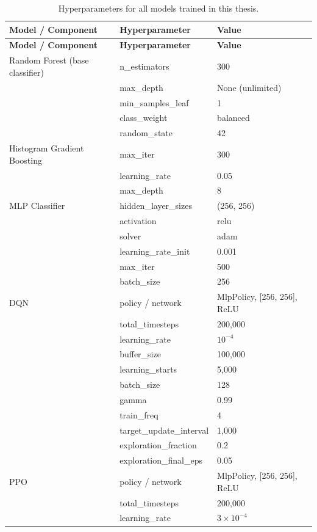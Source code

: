 \begin{longtable}{p{5.8cm} p{5.0cm} p{3.0cm}}
\caption{Hyperparameters for all models trained in this thesis.}
\label{tab:hyperparams}\\
\toprule
\textbf{Model / Component} & \textbf{Hyperparameter} & \textbf{Value} \\
\midrule
\endfirsthead
\toprule
\textbf{Model / Component} & \textbf{Hyperparameter} & \textbf{Value} \\
\midrule
\endhead
\bottomrule
\endfoot
Random Forest (base classifier) & n\_estimators & 300 \\
 & max\_depth & None (unlimited) \\
 & min\_samples\_leaf & 1 \\
 & class\_weight & balanced \\
 & random\_state & 42 \\
\midrule
Histogram Gradient Boosting & max\_iter & 300 \\
 & learning\_rate & 0.05 \\
 & max\_depth & 8 \\
\midrule
MLP Classifier & hidden\_layer\_sizes & (256, 256) \\
 & activation & relu \\
 & solver & adam \\
 & learning\_rate\_init & 0.001 \\
 & max\_iter & 500 \\
 & batch\_size & 256 \\
\midrule
DQN & policy / network & MlpPolicy, [256, 256], ReLU \\
 & total\_timesteps & 200,000 \\
 & learning\_rate & $10^{-4}$ \\
 & buffer\_size & 100,000 \\
 & learning\_starts & 5,000 \\
 & batch\_size & 128 \\
 & gamma & 0.99 \\
 & train\_freq & 4 \\
 & target\_update\_interval & 1,000 \\
 & exploration\_fraction & 0.2 \\
 & exploration\_final\_eps & 0.05 \\
\midrule
PPO & policy / network & MlpPolicy, [256, 256], ReLU \\
 & total\_timesteps & 200,000 \\
 & learning\_rate & $3 \times 10^{-4}$ \\

\end{longtable}
